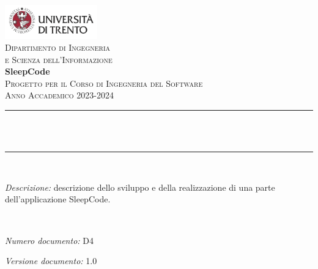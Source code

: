 \begin{titlepage}
\newcommand{\HRule}{\rule{\linewidth}{0.3mm}} %
\center %

\includegraphics[width=0.3\textwidth]{materiale/UniTrento_logo_ITA_colore.png}\\[0.5cm]
\textsc{\Large Dipartimento di Ingegneria\\e Scienza dell'Informazione}\\[1.5cm]

{\Huge\textbf{SleepCode}}\\[0.5cm]
\textsc{\large Progetto per il Corso di Ingegneria del Software}\\
\textsc{\large Anno Accademico 2023-2024}\\[0.5cm]


\HRule\\[0.4cm]
{\huge\bfseries \@title}\\[0.1cm]
\HRule\\[1cm]

\begin{minipage}{\textwidth}
\textit{Descrizione:} descrizione dello sviluppo e della realizzazione di una parte dell'applicazione SleepCode.
\end{minipage}\\[1.5cm]


\begin{minipage}{0.4\textwidth}
\begin{flushleft}
\large
\textit{Numero documento:} D4
\end{flushleft}
\end{minipage}
\begin{minipage}{0.4\textwidth}
\begin{flushright}
\large
\textit{Versione documento:} 1.0
\end{flushright}
\end{minipage}\\[1.5cm]


\end{titlepage}
